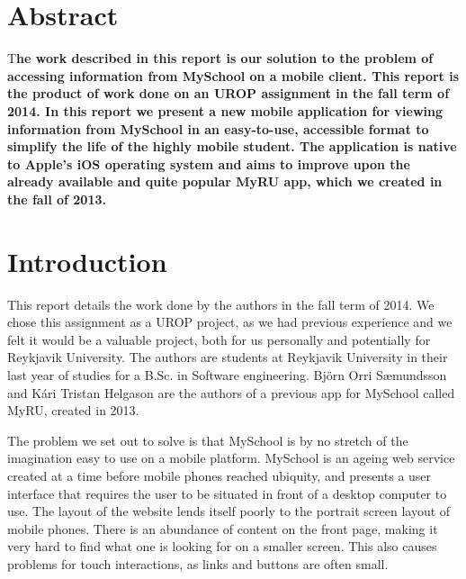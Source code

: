 \documentclass[pdftex, DIV=calc, paper=a4, fontsize=11pt]{scrartcl}	 %
\newcommand{\initial}[1]{ %
\lettrine[lines=3,lhang=0.3,nindent=0em]{
\color{DarkGray}
{\textsf{#1}}}{}}
\begin{document}


\thispagestyle{fancy} %
\setcounter{page}{1}

\section*{Abstract}
\initial{T}\textbf{he work described in this report is our solution to the problem of accessing
information from MySchool on a mobile client. This report is the product of work done on an UROP
assignment in the fall term of 2014. In this report we present a new mobile application
for viewing information from MySchool in an easy-to-use, accessible format to simplify the life
of the highly mobile student. The application is native to Apple's iOS operating system and
aims to improve upon the already available and quite popular MyRU app, which we created in the fall of 2013.}

\pagebreak

\tableofcontents

\pagebreak


\section{Introduction}

This report details the work done by the authors in the fall term of 2014. We chose this assignment
as a UROP project, as we had previous experience and we felt it would be a valuable project,
both for us personally and potentially for Reykjavik University. The authors are students at Reykjavik University
in their last year of studies for a B.Sc. in Software engineering. Björn Orri Sæmundsson and 
Kári Tristan Helgason are the authors of a previous app for MySchool\cite{myschool}
called MyRU\cite{myru}, created in 2013. 

The problem we set out to solve is that MySchool is by no stretch of the imagination easy to use
on a mobile platform. MySchool is an ageing web service created at a time before mobile phones
reached ubiquity, and presents a user interface that requires the
user to be situated in front of a desktop computer to use. The layout of the website lends itself
poorly to the portrait screen layout of mobile phones. There is an abundance of content on the
front page, making it very hard to find what one is looking for on a smaller screen. This also
causes problems for touch interactions, as links and buttons are often small.
\end{document}
